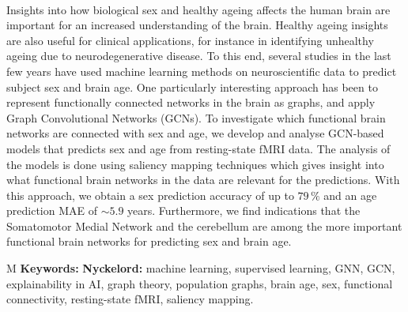 \thesisImprintTitle\\
\thesisImprintSubtitle\\
\thesisAuthor\\
\thesisDepartment\\
\thesisUniversity\setlength{\parskip}{0.5cm}

\thispagestyle{plain}			%
\section*{\abstractname}

Insights into how biological sex and healthy ageing affects the human brain are important for an increased understanding of the brain. Healthy ageing insights are also useful for clinical applications, for instance in identifying unhealthy ageing due to neurodegenerative disease. To this end, several studies in the last few years have used machine learning methods on neuroscientific data to predict subject sex and brain age. One particularly interesting approach has been to represent functionally connected networks in the brain as graphs, and apply Graph Convolutional Networks (GCNs). To investigate which functional brain networks are connected with sex and age, we develop and analyse GCN-based models that predicts sex and age from resting-state fMRI data. The analysis of the models is done using saliency mapping techniques which gives insight into what functional brain networks in the data are relevant for the predictions. With this approach, we obtain a sex prediction accuracy of up to $79\,\%$ and an age prediction MAE of $\sim5.9$ years. Furthermore, we find indications that the Somatomotor Medial Network and the cerebellum are among the more important functional brain networks for predicting sex and brain age.

\vfill
\if\thesisType M
    \textbf{Keywords:}
\else
    \textbf{Nyckelord:}
\fi
machine learning, supervised learning, GNN, GCN, explainability in AI, graph theory, population graphs, brain age, sex, functional connectivity, resting-state fMRI, saliency mapping.
\if{}
\newpage				%
\thispagestyle{empty}
\mbox{}
\fi
